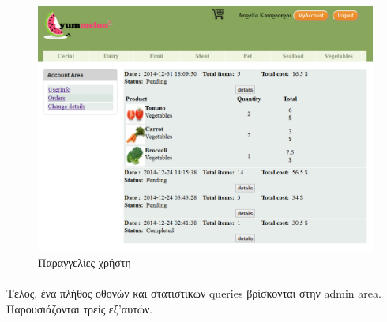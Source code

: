 \documentclass[12pt]{article}
\begin{document}
		\begin{figure}[H]
			\centering
			\includegraphics[width=1\textwidth]{userOrders}
			\caption{Παραγγελίες χρήστη}
		\end{figure}
  	  	 
  	  \paragraph{}
  	  	 Τέλος, ένα πλήθος οθονών και στατιστικών queries βρίσκονται στην admin area.
  	  	 Παρουσιάζονται τρείς εξ'αυτών.
\end{document}
